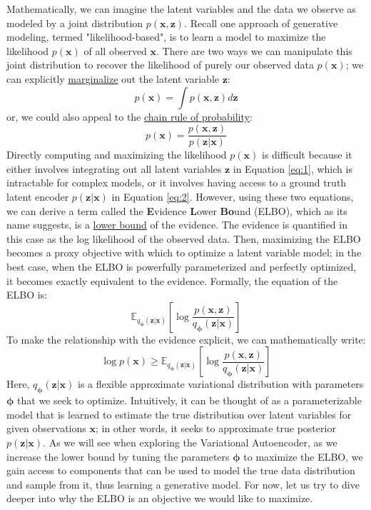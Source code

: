 Mathematically, we can imagine the latent variables and the data we observe as modeled by a joint distribution $p(\bm{x}, \bm{z})$.  Recall one approach of generative modeling, termed "likelihood-based", is to learn a model to maximize the likelihood $p(\bm{x})$ of all observed $\bm{x}$.  There are two ways we can manipulate this joint distribution to recover the likelihood of purely our observed data $p(\bm{x})$; we can explicitly \href{https://en.wikipedia.org/wiki/Marginal_likelihood}{marginalize} out the latent variable $\bm{z}$:
\begin{equation}
\label{eq:1}
p(\bm{x}) = \int p(\bm{x}, \bm{z})d\bm{z}
\end{equation}
or, we could also appeal to the \href{https://en.wikipedia.org/wiki/Chain_rule_(probability)}{chain rule of probability}:
\begin{equation}
\label{eq:2}
p(\bm{x}) = \frac{p(\bm{x}, \bm{z})}{p(\bm{z}|\bm{x})}
\end{equation}
Directly computing and maximizing the likelihood $p(\bm{x})$ is difficult because it either involves integrating out all latent variables $\bm{z}$ in Equation \ref{eq:1}, which is intractable for complex models, or it involves having access to a ground truth latent encoder $p(\bm{z}|\bm{x})$ in Equation \ref{eq:2}.  However, using these two equations, we can derive a term called the \textbf{E}vidence \textbf{L}ower \textbf{Bo}und (ELBO), which as its name suggests, is a \href{https://en.wikipedia.org/wiki/Upper_and_lower_bounds}{lower bound} of the evidence.  The evidence is quantified in this case as the log likelihood of the observed data.  Then, maximizing the ELBO becomes a proxy objective with which to optimize a latent variable model; in the best case, when the ELBO is powerfully parameterized and perfectly optimized, it becomes exactly equivalent to the evidence.  Formally, the equation of the ELBO is:
\begin{equation}
\mathbb{E}_{q_{\bm{\phi}}(\bm{z}|\bm{x})}\left[\log\frac{p(\bm{x}, \bm{z})}{q_{\bm{\phi}}(\bm{z}|\bm{x})}\right]
\end{equation}
To make the relationship with the evidence explicit, we can mathematically write:
\begin{equation}
\log p(\bm{x}) \geq \mathbb{E}_{q_{\bm{\phi}}(\bm{z}|\bm{x})}\left[\log\frac{p(\bm{x}, \bm{z})}{q_{\bm{\phi}}(\bm{z}|\bm{x})}\right]
\end{equation}
Here, $q_{\bm{\phi}}(\bm{z}|\bm{x})$ is a flexible approximate variational distribution with parameters $\bm{\phi}$ that we seek to optimize.  Intuitively, it can be thought of as a parameterizable model that is learned to estimate the true distribution over latent variables for given observations $\bm{x}$; in other words, it seeks to approximate true posterior $p(\bm{z}|\bm{x})$.  As we will see when exploring the Variational Autoencoder, as we increase the lower bound by tuning the parameters $\bm{\phi}$ to maximize the ELBO, we gain access to components that can be used to model the true data distribution and sample from it, thus learning a generative model.  For now, let us try to dive deeper into why the ELBO is an objective we would like to maximize.

